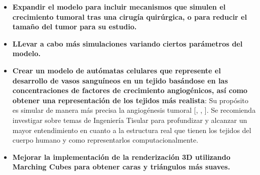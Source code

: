 \begin{recomendations}
\begin{itemize}
    \item \textbf{Expandir el modelo para incluir mecanismos que simulen el crecimiento tumoral tras una cirugía quirúrgica, o para reducir el tamaño del tumor para su estudio.}
    \item \textbf{LLevar a cabo m\'as simulaciones variando ciertos par\'ametros del modelo.}
    \item \textbf{Crear un modelo de autómatas celulares que represente el desarrollo de vasos sanguíneos en un tejido basándose en las concentraciones de factores de crecimiento angiogénicos, as\'i como obtener una representación de los tejidos m\'as realista}: Su propósito es simular de manera más precisa la angiogénesis tumoral [\cite{book}, \cite{vascular}, \cite{angiogenesis}]. Se recomienda investigar sobre temas de Ingenier\'ia Tisular \cite{wu2022} para profundizar y alcanzar un mayor entendimiento en cuanto a la estructura real que tienen los tejidos del cuerpo humano y como representarlos computacionalmente.
    \item \textbf{Mejorar la implementación de la renderización 3D utilizando Marching Cubes para obtener caras y triángulos más suaves.} 
\end{itemize}
\end{recomendations}
